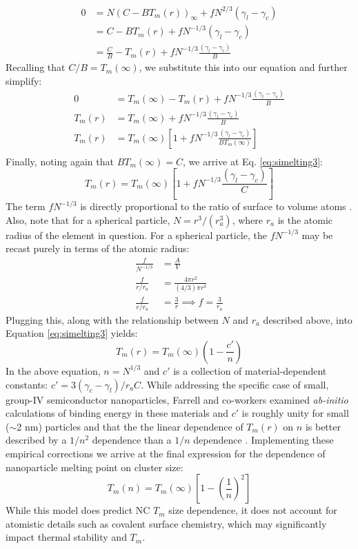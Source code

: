 \begin{align*}
0 &= N(C - BT_m(r))_{\infty} + fN^{2/3}(\gamma_l - \gamma_c) \\
  &= C - BT_m(r) + fN^{-1/3}(\gamma_l - \gamma_c) \\
  &= \frac{C}{B} - T_m(r) + fN^{-1/3}\frac{(\gamma_l - \gamma_c)}{B}
\end{align*}
Recalling that $C/B = T_m(\infty)$, we substitute this into our equation and further simplify:
\begin{align*}
0 &= T_m(\infty) - T_m(r) + fN^{-1/3}\frac{(\gamma_l - \gamma_c)}{B}\\
T_m(r) &= T_m(\infty) + fN^{-1/3}\frac{(\gamma_l - \gamma_c)}{B} \\
T_m(r) &= T_m(\infty)\left[1 + fN^{-1/3}\frac{(\gamma_l - \gamma_c)}{BT_m(\infty)}\right] \\
\end{align*}
Finally, noting again that $BT_m(\infty) = C$, we arrive at Eq. \ref{eq:simelting3}:
\begin{equation}\label{eq:simelting3}
T_m(r) = T_m(\infty)\left[1 + fN^{-1/3}\frac{(\gamma_l - \gamma_c)}{C}\right] 
\end{equation}
The term $fN^{-1/3}$ is directly proportional to the ratio of surface to volume atoms \cite{wautelet2003phase}. Also, note that for a spherical particle, $N = r^3/(r_a^3)$, where $r_a$ is the atomic radius of the element in question. For a spherical particle, the $fN^{-1/3}$ may be recast purely in terms of the atomic radius:
\begin{align*} 
\frac{f}{N^{-1/3}} &= \frac{A}{V} \\
\frac{f}{r/r_a} &= \frac{4\pi r^2}{\left(4/3\right)\pi r^3} \\
\frac{f}{r/r_a} &= \frac{3}{r} \implies f = \frac{3}{r_a}
\end{align*}
Plugging this, along with the relationship between $N$ and $r_a$ described above, into Equation \ref{eq:simelting3} yields:
\begin{equation}\label{eq:simelting4}
T_m(r) = T_m(\infty) \left(1 - \frac{c'}{n}\right)
\end{equation}
In the above equation, $n = N^{1/3}$ and $c'$ is a collection of material-dependent constants: $c' = 3\left(\gamma_c - \gamma_l\right)/r_aC$. While addressing the specific case of small, group-IV semiconductor nanoparticles, Farrell and co-workers examined \emph{ab-initio} calculations of binding energy in these materials and $c'$ is roughly unity for small ($\sim$2 nm) particles and that the the linear dependence of $T_m(r)$ on $n$ is better described by a $1/n^2$ dependence than a $1/n$ dependence \cite{farrell2007binding}. Implementing these empirical corrections we arrive at the final expression for the dependence of nanoparticle melting point on cluster size:
\begin{equation}\label{eq:simelting5}
T_m(n) = T_m(\infty)\left[1 - \left(\frac{1}{n}\right)^2\right]
\end{equation}
While this model does predict NC $T_m$ size dependence, it does not account for atomistic details such as covalent surface chemistry, which may significantly impact thermal stability and $T_m$.

